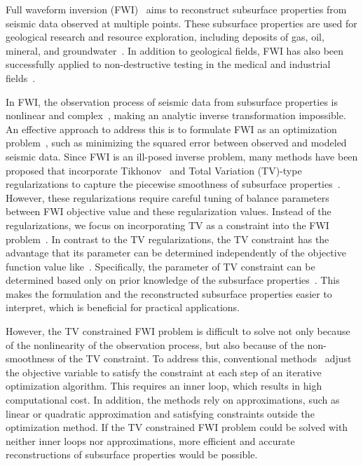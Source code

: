 Full waveform inversion (FWI)~\cite{FWI0,FWI1} aims to reconstruct subsurface properties from seismic data observed at multiple points.
These subsurface properties are used for geological research and resource exploration, including deposits of gas, oil, mineral, and groundwater~\cite{FWI1,FWIApplicationGroundwater0,FWIApplicationGroundwater1}.
In addition to geological fields, FWI has also been successfully applied to non-destructive testing in the medical and industrial fields~\cite{FWIApplicationNonDestructiveTesting0,FWIApplicationNonDestructiveTesting1}.

In FWI, the observation process of seismic data from subsurface properties is nonlinear and complex~\cite{FWI1}, making an analytic inverse transformation impossible.
An effective approach to address this is to formulate FWI as an optimization problem~\cite{FWI0,CustomFWI0,CustomFWI1,CustomFWI2,CustomFWI3,CustomFWI4,CustomFWI5}, such as minimizing the squared error between observed and modeled seismic data.
Since FWI is an ill-posed inverse problem, many methods have been proposed that incorporate Tikhonov~\cite{tikhonov} and Total Variation (TV)-type~\cite{TV,TGV} regularizations to capture the piecewise smoothness of subsurface properties~\cite{FWI-with-tikhonov-regularization,FWI-with-TV-regularization,FWI-with-directional-TV-regularization,FWI-with-high-order-TV-regularization,FWI-with-TGV-regularization}.
However, these regularizations require careful tuning of balance parameters between FWI objective value and these regularization values.
Instead of the regularizations, we focus on incorporating TV as a constraint into the FWI problem~\cite{FWI-with-TV-constraint,FWI-with-TV-constraint2,FWI-with-TV-constraint3,FWI-with-TV-constraint4}.
In contrast to the TV regularizations, the TV constraint has the advantage that its parameter can be determined independently of the objective function value like~\cite{constraint0,constraint1,constraint2,constraint3,constraint4}.
Specifically, the parameter of TV constraint can be determined based only on prior knowledge of the subsurface properties~\cite{constraints-vs-penalties-in-FWI}.
This makes the formulation and the reconstructed subsurface properties easier to interpret, which is beneficial for practical applications.

However, the TV constrained FWI problem is difficult to solve not only because of the nonlinearity of the observation process, but also because of the non-smoothness of the TV constraint.
To address this, conventional methods~\cite{FWI-with-TV-constraint,FWI-with-TV-constraint2,FWI-with-TV-constraint3,FWI-with-TV-constraint4} adjust the objective variable to satisfy the constraint at each step of an iterative optimization algorithm.
This requires an inner loop, which results in high computational cost.
In addition, the methods rely on approximations, such as linear or quadratic approximation and satisfying constraints outside the optimization method.
If the TV constrained FWI problem could be solved with neither inner loops nor approximations, more efficient and accurate reconstructions of subsurface properties would be possible.

